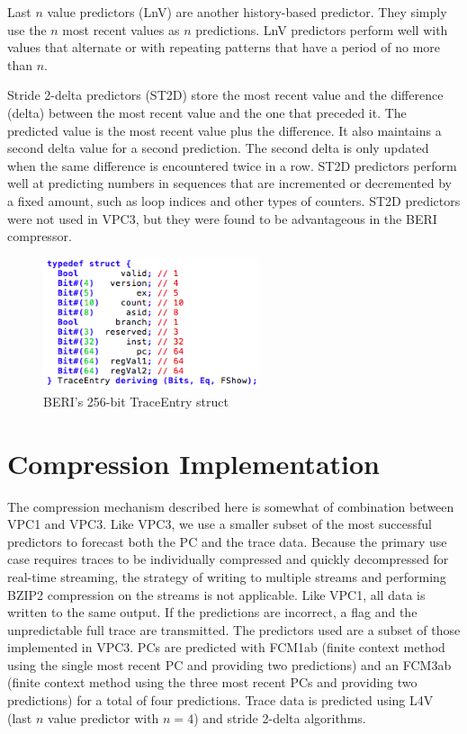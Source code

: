 \documentclass[conference]{IEEEtran}
\begin{document}
Last $n$ value predictors (LnV) \cite{burtscher1999} are another history-based predictor. They simply use the $n$ most recent values as $n$ predictions. LnV predictors perform well with values that alternate or with repeating patterns that have a period of no more than $n$. 

Stride 2-delta predictors (ST2D) \cite{gabbay1996} store the most recent value and the difference (delta) between the most recent value and the one that preceded it. The predicted value is the most recent value plus the difference. It also maintains a second delta value for a second prediction. The second delta is only updated when the same difference is encountered twice in a row. ST2D predictors perform well at predicting numbers in sequences that are incremented or decremented by a fixed amount, such as loop indices and other types of counters. ST2D predictors were not used in VPC3, but they were found to be advantageous in the BERI compressor. 
\begin{figure}[!b]
\centering
\includegraphics[width=2.5in]{images/trace_types.png}
\caption{BERI's 256-bit TraceEntry struct}
\label{trace_types}
\end{figure}


\section{Compression Implementation}
The compression mechanism described here is somewhat of combination between VPC1 and VPC3. Like VPC3, we use a smaller subset of the most successful predictors to forecast both the PC and the trace data. Because the primary use case requires traces to be individually compressed and quickly decompressed for real-time streaming, the strategy of writing to multiple streams and performing BZIP2 compression on the streams is not applicable. Like VPC1, all data is written to the same output. If the predictions are incorrect, a flag and the unpredictable full trace are transmitted. The predictors used are a subset of those implemented in VPC3. PCs are predicted with FCM1ab (finite context method using the single most recent PC and providing two predictions) and an FCM3ab (finite context method using the three most recent PCs and providing two predictions) for a total of four predictions. Trace data is predicted using L4V (last $n$ value predictor with $n=4$) and stride 2-delta algorithms. 
\end{document}
